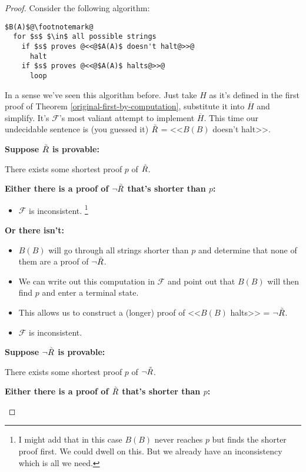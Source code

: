 \documentclass{article}
\theoremstyle{theorem}
\newcommand{\nameditem}[1]{\item\textbf{#1}}
\newcommand{\impl}{\item[$\Rightarrow$]}
\newcommand{\infi}[1]{\accentset{\scalebox{0.35}{$\infty$}}{#1}}
\begin{document}
\begin{proof}
Consider the following algorithm:\\[0.5em]
\begin{minipage}{\linewidth}
\begin{lstlisting}
$B(A)$@\footnotemark@
  for $s$ $\in$ all possible strings
    if $s$ proves @<<@$A(A)$ doesn't halt@>>@
      halt
    if $s$ proves @<<@$A(A)$ halts@>>@
      loop
\end{lstlisting}
\end{minipage}
In a sense we've seen this algorithm before. Just take $H$ as it's defined in the first proof of Theorem \ref{original-first-by-computation}, substitute it into $\overline{H}$ and simplify. It's $\mathcal{F}$'s most valiant attempt to implement $\overline{H}$. This time our undecidable sentence is (you guessed it) $\infi{R}$ = <<$B(B)$ doesn't halt>>.
\begin{description}
\nameditem{Suppose $\infi{R}$ is provable:}
\begin{description}
\impl There exists some shortest proof $p$ of $\infi{R}$.
\nameditem{Either there is a proof of $\neg \infi{R}$ that's shorter than $p$:}
\begin{itemize}
\impl $\mathcal{F}$ is inconsistent. \lightning\footnote{I might add that in this case $B(B)$ never reaches $p$ but finds the shorter proof first. We could dwell on this. But we already have an inconsistency which is all we need.}
\end{itemize}
\nameditem{Or there isn't:}
\begin{itemize}
\impl $B(B)$ will go through all strings shorter than $p$ and determine that none of them are a proof of $\neg \infi{R}$.
\impl We can write out this computation in $\mathcal{F}$ and point out that $B(B)$ will then find $p$ and enter a terminal state.
\impl This allows us to construct a (longer) proof of <<$B(B)$ halts>> = $\neg \infi{R}$.
\impl $\mathcal{F}$ is inconsistent. \lightning
\end{itemize}
\end{description}
\nameditem{Suppose $\neg \infi{R}$ is provable:}
\begin{description}
\impl There exists some shortest proof $p$ of $\neg \infi{R}$.
\nameditem{Either there is a proof of $\infi{R}$ that's shorter than $p$:}
\begin{itemize}

\end{itemize}
\end{description}
\end{description}
\end{proof}
\end{document}
